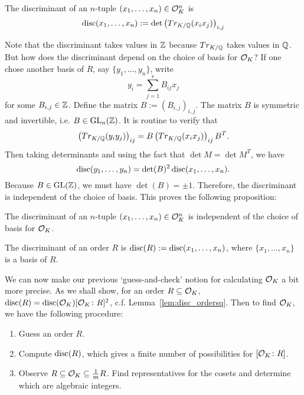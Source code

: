  
\begin{dfn}[Discriminant]
The discriminant of an $n$-tuple $(x_1, \ldots, x_n) \in \mathcal{O}_K^n$ is
	\[
	\operatorname{disc}(x_1,\ldots,x_n):= \det\left( Tr_{K/\mathbb{Q}}(x_ix_j) \right)_{i,j}
	\]
\end{dfn}


Note that the discriminant takes values in $\mathbb{Z}$ because $Tr_{K/\mathbb{Q}}$ takes values in $\mathbb{Q}$. But how does the discriminant depend on the choice of basis for $\mathcal{O}_K$? If one chose another basis of $R$, say $\{ y_1, \ldots, y_n \}$, write
	\[
	y_i= \sum_{j=1}^r B_{ij} x_j
	\]
for some $B_{i,j} \in \mathbb{Z}$. Define the matrix $B:= (B_{i,j})_{i,j}$. The matrix $B$ is symmetric and invertible, i.e. $B \in \operatorname{GL}_n(\mathbb{Z})$. It is routine to verify that
	\[
	\left( Tr_{K/\mathbb{Q}}(y_iy_j) \right)_{ij}= B \left( Tr_{K/\mathbb{Q}}(x_ix_j) \right)_{ij} B^T.
	\]
Then taking determinants and using the fact that $\det M= \det M^T$, we have
	\[
	\operatorname{disc}(y_1, \ldots, y_n)= \det(B)^2 \operatorname{disc}(x_1, \ldots, x_n).
	\]
Because $B \in \operatorname{GL}(\mathbb{Z})$, we must have $\det(B)= \pm 1$. Therefore, the discriminant is independent of the choice of basis. This proves the following proposition:


\begin{prop}
The discriminant of an $n$-tuple $(x_1, \ldots, x_n) \in \mathcal{O}_K^n$ is independent of the choice of basis for $\mathcal{O}_K$.
\end{prop}


\begin{dfn}
The discriminant of an order $R$ is $\operatorname{disc}(R):= \operatorname{disc}(x_1, \ldots, x_n)$, where $\{ x_1, \ldots, x_n \}$ is a basis of $R$.
\end{dfn}


We can now make our previous `guess-and-check' notion for calculating $\mathcal{O}_K$ a bit more precise. As we shall show, for an order $R \subseteq \mathcal{O}_K$, $\operatorname{disc}(R)= \operatorname{disc}(\mathcal{O}_K) [\mathcal{O}_K \colon R]^2$, c.f. Lemma~\ref{lem:disc_ordersq}. Then to find $\mathcal{O}_K$, we have the following procedure: \pskip


	\begin{enumerate}[1.]
	\item Guess an order $R$.
	\item Compute $\operatorname{disc}(R)$, which gives a finite number of possibilities for $[\mathcal{O}_K \colon R]$.
	\item Observe $R \subseteq \mathcal{O}_K \subseteq \frac{1}{m} R$. Find representatives for the cosets and determine which are algebraic integers. 
	\end{enumerate} \pskip


